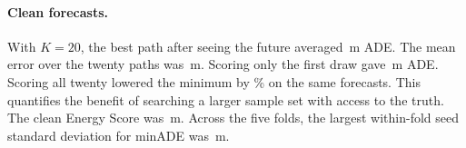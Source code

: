 \paragraph{Clean forecasts.}
With \(K=20\), the best path after seeing the future averaged
\,m ADE. The mean error
over the twenty paths was \,m.
Scoring only the first draw gave \,m ADE.
Scoring all twenty lowered the minimum by \%
on the same forecasts. This quantifies the benefit of searching a larger
sample set with access to the truth. The clean Energy Score was
\,m. Across the five
folds, the largest within-fold seed standard deviation for minADE was
\,m.

